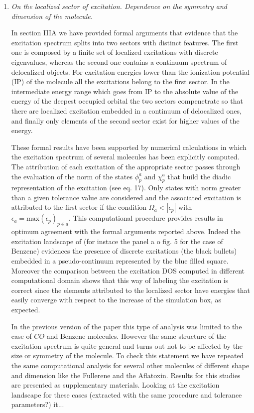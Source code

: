 \documentclass[11pt,a4paper]{article}
\begin{document}
\begin{enumerate}
 
 \item \emph{On the localized sector of excitation. Dependence on the symmetry and dimension of the molecule.}
 
 In section IIIA we have provided formal arguments that evidence that the excitation spectrum splits into two sectors with distinct features. The first one
 is composed by a finite set of localized excitations with discrete eigenvalues, whereas the second one contains a continuum spectrum of delocalized objects.
 For excitation energies lower than the ionization potential (IP) of the molecule all the excitations belong to the first sector. In the intermediate energy range which goes from IP to the absolute value of the energy of the deepest occupied orbital the two sectors compenetrate so that there are localized excitation embedded in a continuum of delocalized ones, and finally only elements of the second sector exist for higher values of the energy. 
 
 These formal results have been supported by numerical calculations in which the excitation spectrum of several molecules has been explicitly computed. %
 The attribution of each excitation of the appropriate sector passes through the evaluation of the norm of the states $\phi_p^a$ and $\chi_p^a$ that build
 the diadic representation of the excitation (see eq. 17). Only states with norm greater than a given tolerance value are considered and the associated 
 excitation is attributed to the first sector if the condition $\Omega_a < |\epsilon_p|$ with $\epsilon_a = \mathrm{max}\left(\epsilon_p\right)_{p\in a}$.
 This computational procedure provides results in optimum agreement with the formal arguments reported above. Indeed the excitation landscape of 
 (for instace the panel a o fig. 5 for the case of Benzene) evidences the presence of discrete excitations (the black bullets) embedded in a pseudo-continuum 
 represented by the blue filled square. Moreover the comparison between the excitation DOS computed in different computational domain shows that this way of labeling the excitation is correct since the elements attributed to the localized sector have energies that easily converge with respect to the increase of the simulation box, as expected.  
 
 In the previous version of the paper this type of analysis was limited to the case of $CO$ and Benzene molecules. However the same structure of the excitation spectrum is quite general and turns out not to be affected by the size or symmetry of the molecule. To check this statement we have repeated
 the same computational analysis for several other molecules of different shape and dimension like the Fullerene and the Aflatoxin. Results for this studies 
 are presented as supplementary materials. Looking at the excitation landscape for these cases (extracted with the same procedure and tolerance parameters?) it...  
 

\end{enumerate}
\end{document}
